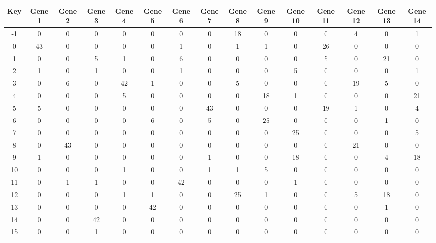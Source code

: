 \begin{tabular}{|c|c|c|c|c|c|c|c|c|c|c|c|c|c|c|}
\hline
Key & Gene 1 & Gene 2 & Gene 3 & Gene 4 & Gene 5 & Gene 6 & Gene 7 & Gene 8 & Gene 9 & Gene 10 & Gene 11 & Gene 12 & Gene 13 & Gene 14 \\
\hline
-1 & 0 & 0 & 0 & 0 & 0 & 0 & 0 & 18 & 0 & 0 & 0 & 4 & 0 & 1 \\
0 & 43 & 0 & 0 & 0 & 0 & 1 & 0 & 1 & 1 & 0 & 26 & 0 & 0 & 0 \\
1 & 0 & 0 & 5 & 1 & 0 & 6 & 0 & 0 & 0 & 0 & 5 & 0 & 21 & 0 \\
2 & 1 & 0 & 1 & 0 & 0 & 1 & 0 & 0 & 0 & 5 & 0 & 0 & 0 & 1 \\
3 & 0 & 6 & 0 & 42 & 1 & 0 & 0 & 5 & 0 & 0 & 0 & 19 & 5 & 0 \\
4 & 0 & 0 & 0 & 5 & 0 & 0 & 0 & 0 & 18 & 1 & 0 & 0 & 0 & 21 \\
5 & 5 & 0 & 0 & 0 & 0 & 0 & 43 & 0 & 0 & 0 & 19 & 1 & 0 & 4 \\
6 & 0 & 0 & 0 & 0 & 6 & 0 & 5 & 0 & 25 & 0 & 0 & 0 & 1 & 0 \\
7 & 0 & 0 & 0 & 0 & 0 & 0 & 0 & 0 & 0 & 25 & 0 & 0 & 0 & 5 \\
8 & 0 & 43 & 0 & 0 & 0 & 0 & 0 & 0 & 0 & 0 & 0 & 21 & 0 & 0 \\
9 & 1 & 0 & 0 & 0 & 0 & 0 & 1 & 0 & 0 & 18 & 0 & 0 & 4 & 18 \\
10 & 0 & 0 & 0 & 1 & 0 & 0 & 1 & 1 & 5 & 0 & 0 & 0 & 0 & 0 \\
11 & 0 & 1 & 1 & 0 & 0 & 42 & 0 & 0 & 0 & 1 & 0 & 0 & 0 & 0 \\
12 & 0 & 0 & 0 & 1 & 1 & 0 & 0 & 25 & 1 & 0 & 0 & 5 & 18 & 0 \\
13 & 0 & 0 & 0 & 0 & 42 & 0 & 0 & 0 & 0 & 0 & 0 & 0 & 1 & 0 \\
14 & 0 & 0 & 42 & 0 & 0 & 0 & 0 & 0 & 0 & 0 & 0 & 0 & 0 & 0 \\
15 & 0 & 0 & 1 & 0 & 0 & 0 & 0 & 0 & 0 & 0 & 0 & 0 & 0 & 0 \\
\hline
\end{tabular}